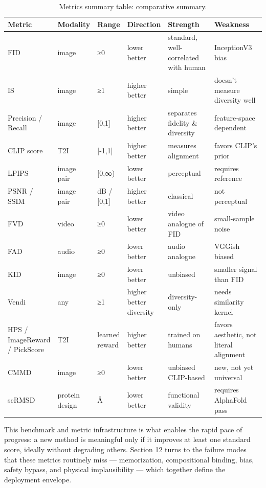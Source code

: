 \documentclass{article}
\begin{document}
\begin{table}[t]
\centering
\caption{Metrics summary table: comparative summary.}
\label{tab:metrics-summary-table}
\begin{tabular}{>{\raggedright\arraybackslash}p{0.1871\linewidth}
  >{\raggedright\arraybackslash}p{0.0903\linewidth}
  >{\raggedright\arraybackslash}p{0.0903\linewidth}
  >{\raggedright\arraybackslash}p{0.1484\linewidth}
  >{\raggedright\arraybackslash}p{0.2323\linewidth}
  >{\raggedright\arraybackslash}p{0.2516\linewidth}}
\toprule
Metric & Modality & Range & Direction & Strength & Weakness \\
\midrule
FID & image & ≥0 & lower better & standard, well-correlated with human & InceptionV3 bias \\
IS & image & ≥1 & higher better & simple & doesn't measure diversity well \\
Precision / Recall & image & {[}0,1{]} & higher better & separates fidelity \& diversity & feature-space dependent \\
CLIP score & T2I & {[}-1,1{]} & higher better & measures alignment & favors CLIP's prior \\
LPIPS & image pair & {[}0,∞) & lower better & perceptual & requires reference \\
PSNR / SSIM & image pair & dB / {[}0,1{]} & higher better & classical & not perceptual \\
FVD & video & ≥0 & lower better & video analogue of FID & small-sample noise \\
FAD & audio & ≥0 & lower better & audio analogue & VGGish biased \\
KID & image & ≥0 & lower better & unbiased & smaller signal than FID \\
Vendi & any & ≥1 & higher better diversity & diversity-only & needs similarity kernel \\
HPS / ImageReward / PickScore & T2I & learned reward & higher better & trained on humans & favors aesthetic, not literal alignment \\
CMMD \citep{jayasumana20242024} & image & ≥0 & lower better & unbiased CLIP-based & new, not yet universal \\
scRMSD & protein design & Å & lower better & functional validity & requires AlphaFold pass \\
\end{tabular}
\end{table}

This benchmark and metric infrastructure is what enables the rapid pace of progress: a new method is meaningful only if it improves at least one standard score, ideally without degrading others. Section 12 turns to the failure modes that these metrics routinely miss --- memorization, compositional binding, bias, safety bypass, and physical implausibility --- which together define the deployment envelope.
\end{document}
